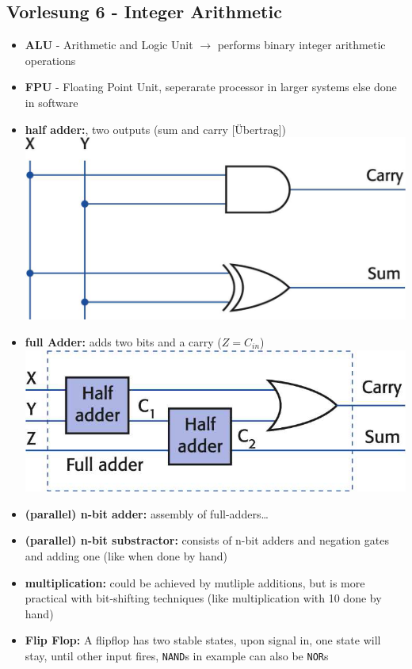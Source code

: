 \subsection*{Vorlesung 6 - Integer Arithmetic}
 \begin{itemize}
  \item \textbf{ALU} - Arithmetic and Logic Unit $\to$ performs binary integer arithmetic operations
  \item \textbf{FPU} - Floating Point Unit, seperarate processor in larger systems else done in software
  \item \textbf{half adder:}, two outputs (sum and carry [\"Ubertrag]) \\
  \includegraphics[scale=0.6]{arith-halfadder.png}
  \item \textbf{full Adder:} adds two bits and a carry ($Z=C_{in}$)\\
    \includegraphics[scale=0.6]{arith-fulladder.png}
    \item \textbf{(parallel) n-bit adder:} assembly of full-adders\dots
    \item \textbf{(parallel) n-bit substractor:} consists of n-bit adders and negation gates and adding one (like when done by hand)
    \item \textbf{multiplication:} could be achieved by mutliple additions, but is more practical with bit-shifting techniques (like multiplication with 10 done by hand)
    \item \textbf{Flip Flop:} A flipflop has two stable states, upon signal in, one state will stay, until other input fires, \texttt{NAND}s in example can also be \texttt{NOR}s\\

\end{itemize}
